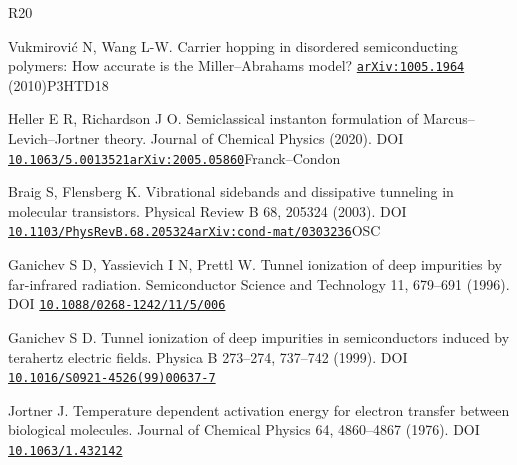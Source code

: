 \begin{thebibliography}{R20}
\par
 Vukmirović N, Wang L-W. Carrier hopping in disordered semiconducting polymers: How accurate is the Miller–Abrahams model? \href{https://arxiv.org/abs/1005.1964}{\nolinkurl{arXiv:1005.1964}} (2010)\allowbreak{}P3HT\allowbreak{}D18\allowbreak{}
\par
 Heller E R, Richardson J O. Semiclassical instanton formulation of Marcus–Levich–Jortner theory. Journal of Chemical Physics (2020). DOI \href{https://doi.org/10.1063/5.0013521}{\nolinkurl{10.1063/5.0013521}}\allowbreak{}\href{https://arxiv.org/abs/2005.05860}{\nolinkurl{arXiv:2005.05860}}\allowbreak{}Franck–Condon\allowbreak{}
\par
 Braig S, Flensberg K. Vibrational sidebands and dissipative tunneling in molecular transistors. Physical Review B 68, 205324 (2003). DOI \href{https://doi.org/10.1103/PhysRevB.68.205324}{\nolinkurl{10.1103/PhysRevB.68.205324}}\allowbreak{}\href{https://arxiv.org/abs/cond-mat/0303236}{\nolinkurl{arXiv:cond-mat/0303236}}\allowbreak{}OSC\allowbreak{}
\par
 Ganichev S D, Yassievich I N, Prettl W. Tunnel ionization of deep impurities by far-infrared radiation. Semiconductor Science and Technology 11, 679–691 (1996). DOI \href{https://doi.org/10.1088/0268-1242/11/5/006}{\nolinkurl{10.1088/0268-1242/11/5/006}}\allowbreak{}
\par
 Ganichev S D. Tunnel ionization of deep impurities in semiconductors induced by terahertz electric fields. Physica B 273–274, 737–742 (1999). DOI \href{https://doi.org/10.1016/S0921-4526(99)00637-7}{\nolinkurl{10.1016/S0921-4526(99)00637-7}}\allowbreak{}
\par
 Jortner J. Temperature dependent activation energy for electron transfer between biological molecules. Journal of Chemical Physics 64, 4860–4867 (1976). DOI \href{https://doi.org/10.1063/1.432142}{\nolinkurl{10.1063/1.432142}}\allowbreak{}
\par
\end{thebibliography}
